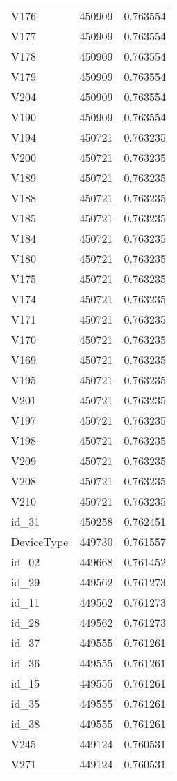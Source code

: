 \begin{tabular}{lrr}
V176 & 450909 & 0.763554 \\
V177 & 450909 & 0.763554 \\
V178 & 450909 & 0.763554 \\
V179 & 450909 & 0.763554 \\
V204 & 450909 & 0.763554 \\
V190 & 450909 & 0.763554 \\
V194 & 450721 & 0.763235 \\
V200 & 450721 & 0.763235 \\
V189 & 450721 & 0.763235 \\
V188 & 450721 & 0.763235 \\
V185 & 450721 & 0.763235 \\
V184 & 450721 & 0.763235 \\
V180 & 450721 & 0.763235 \\
V175 & 450721 & 0.763235 \\
V174 & 450721 & 0.763235 \\
V171 & 450721 & 0.763235 \\
V170 & 450721 & 0.763235 \\
V169 & 450721 & 0.763235 \\
V195 & 450721 & 0.763235 \\
V201 & 450721 & 0.763235 \\
V197 & 450721 & 0.763235 \\
V198 & 450721 & 0.763235 \\
V209 & 450721 & 0.763235 \\
V208 & 450721 & 0.763235 \\
V210 & 450721 & 0.763235 \\
id_31 & 450258 & 0.762451 \\
DeviceType & 449730 & 0.761557 \\
id_02 & 449668 & 0.761452 \\
id_29 & 449562 & 0.761273 \\
id_11 & 449562 & 0.761273 \\
id_28 & 449562 & 0.761273 \\
id_37 & 449555 & 0.761261 \\
id_36 & 449555 & 0.761261 \\
id_15 & 449555 & 0.761261 \\
id_35 & 449555 & 0.761261 \\
id_38 & 449555 & 0.761261 \\
V245 & 449124 & 0.760531 \\
V271 & 449124 & 0.760531 \\

\end{tabular}
